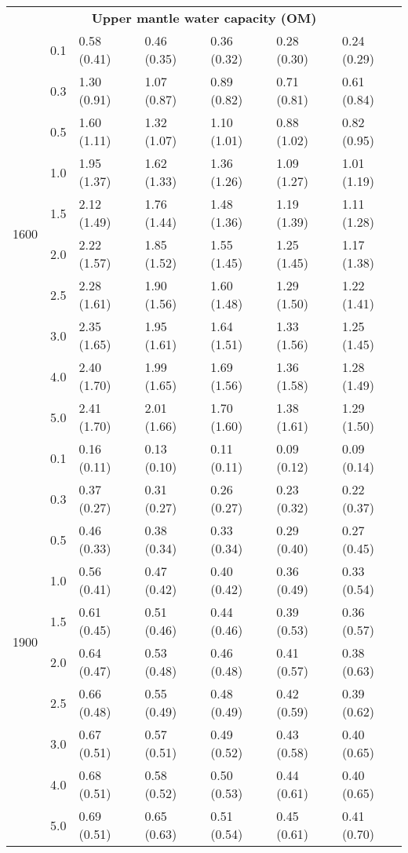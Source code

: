\begin{table*}
\begin{tabular}{@{} c c l l l l l @{}}
\multicolumn{7}{c}{\textbf{Upper mantle water capacity (OM)}} \\
\multirow{10}{*}{1600} & 0.1 & 0.58 (0.41) & 0.46 (0.35) & 0.36 (0.32) & 0.28 (0.30) & 0.24 (0.29) \\
 & 0.3 & 1.30 (0.91) & 1.07 (0.87) & 0.89 (0.82) & 0.71 (0.81) & 0.61 (0.84) \\
 & 0.5 & 1.60 (1.11) & 1.32 (1.07) & 1.10 (1.01) & 0.88 (1.02) & 0.82 (0.95) \\
 & 1.0 & 1.95 (1.37) & 1.62 (1.33) & 1.36 (1.26) & 1.09 (1.27) & 1.01 (1.19) \\
 & 1.5 & 2.12 (1.49) & 1.76 (1.44) & 1.48 (1.36) & 1.19 (1.39) & 1.11 (1.28) \\
 & 2.0 & 2.22 (1.57) & 1.85 (1.52) & 1.55 (1.45) & 1.25 (1.45) & 1.17 (1.38) \\
 & 2.5 & 2.28 (1.61) & 1.90 (1.56) & 1.60 (1.48) & 1.29 (1.50) & 1.22 (1.41) \\
 & 3.0 & 2.35 (1.65) & 1.95 (1.61) & 1.64 (1.51) & 1.33 (1.56) & 1.25 (1.45) \\
 & 4.0 & 2.40 (1.70) & 1.99 (1.65) & 1.69 (1.56) & 1.36 (1.58) & 1.28 (1.49) \\
 & 5.0 & 2.41 (1.70) & 2.01 (1.66) & 1.70 (1.60) & 1.38 (1.61) & 1.29 (1.50) \\
\hline
\multirow{10}{*}{1900} & 0.1 & 0.16 (0.11) & 0.13 (0.10) & 0.11 (0.11) & 0.09 (0.12) & 0.09 (0.14) \\
 & 0.3 & 0.37 (0.27) & 0.31 (0.27) & 0.26 (0.27) & 0.23 (0.32) & 0.22 (0.37) \\
 & 0.5 & 0.46 (0.33) & 0.38 (0.34) & 0.33 (0.34) & 0.29 (0.40) & 0.27 (0.45) \\
 & 1.0 & 0.56 (0.41) & 0.47 (0.42) & 0.40 (0.42) & 0.36 (0.49) & 0.33 (0.54) \\
 & 1.5 & 0.61 (0.45) & 0.51 (0.46) & 0.44 (0.46) & 0.39 (0.53) & 0.36 (0.57) \\
 & 2.0 & 0.64 (0.47) & 0.53 (0.48) & 0.46 (0.48) & 0.41 (0.57) & 0.38 (0.63) \\
 & 2.5 & 0.66 (0.48) & 0.55 (0.49) & 0.48 (0.49) & 0.42 (0.59) & 0.39 (0.62) \\
 & 3.0 & 0.67 (0.51) & 0.57 (0.51) & 0.49 (0.52) & 0.43 (0.58) & 0.40 (0.65) \\
 & 4.0 & 0.68 (0.51) & 0.58 (0.52) & 0.50 (0.53) & 0.44 (0.61) & 0.40 (0.65) \\
 & 5.0 & 0.69 (0.51) & 0.65 (0.63) & 0.51 (0.54) & 0.45 (0.61) & 0.41 (0.70) \\
\hline







\end{tabular}
\end{table*}






